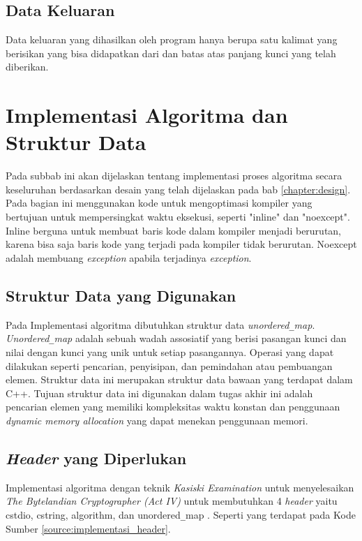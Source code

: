 \subsection{Data Keluaran}
Data keluaran yang dihasilkan oleh program hanya berupa satu kalimat yang berisikan \plaintext yang bisa didapatkan dari \ciphertext dan batas atas panjang kunci yang telah diberikan.

\section{Implementasi Algoritma dan Struktur Data}
Pada subbab ini akan dijelaskan tentang implementasi proses
algoritma secara keseluruhan berdasarkan desain yang telah dijelaskan pada bab \ref{chapter:design}. Pada bagian ini menggunakan kode untuk mengoptimasi kompiler yang bertujuan untuk mempersingkat waktu eksekusi, seperti "inline" dan "noexcept". Inline berguna untuk membuat baris kode dalam kompiler menjadi berurutan, karena bisa saja baris kode yang terjadi pada kompiler tidak berurutan. Noexcept adalah membuang  \textit{exception} apabila terjadinya \textit{exception}.

\subsection{Struktur Data yang Digunakan}
Pada Implementasi algoritma dibutuhkan struktur data \textit{unordered}\verb|_|\textit{map}. \textit{Unordered}\verb|_|\textit{map} adalah sebuah wadah assosiatif yang berisi pasangan kunci dan nilai dengan kunci yang unik untuk setiap pasangannya. Operasi yang dapat dilakukan seperti pencarian, penyisipan, dan pemindahan atau pembuangan elemen. Struktur data ini merupakan struktur data bawaan yang terdapat dalam C++. Tujuan struktur data ini digunakan dalam tugas akhir ini adalah pencarian elemen yang memiliki kompleksitas waktu konstan dan penggunaan \textit{dynamic memory allocation} yang dapat menekan penggunaan memori. 

\subsection{\textit{Header} yang Diperlukan}
Implementasi algoritma dengan teknik \textit{Kasiski Examination} untuk menyelesaikan \textit{The Bytelandian Cryptographer (Act IV)} untuk membutuhkan 4 \textit{header} yaitu {\selectfont cstdio, cstring, algorithm, dan unordered\verb|_|map} . Seperti yang terdapat pada Kode Sumber \ref{source:implementasi_header}.

